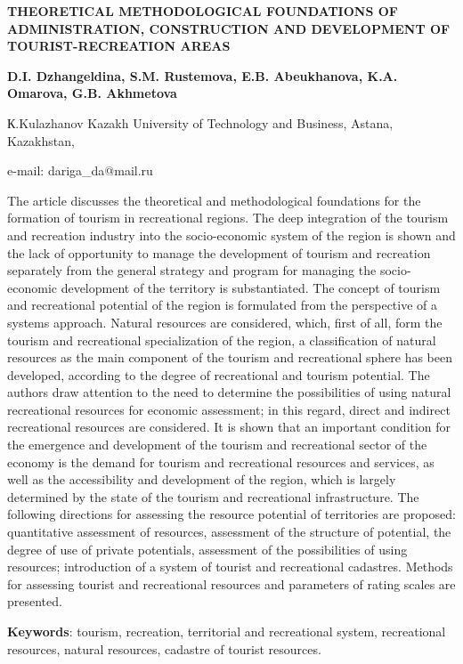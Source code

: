 \begin{center}
{\large\bfseries THEORETICAL METHODOLOGICAL FOUNDATIONS OF ADMINISTRATION,
CONSTRUCTION AND DEVELOPMENT OF TOURIST-RECREATION AREAS}

{\bfseries D.I. Dzhangeldina\envelope, S.M. Rustemova, E.B. Abeukhanova, K.A. Omarova, G.B. Akhmetova}

К.Kulazhanov Kazakh University of Technology and Business, Astana,
Kazakhstan,

e-mail: dariga\_da@mail.ru
\end{center}

The article discusses the theoretical and methodological foundations for
the formation of tourism in recreational regions. The deep integration
of the tourism and recreation industry into the socio-economic system of
the region is shown and the lack of opportunity to manage the
development of tourism and recreation separately from the general
strategy and program for managing the socio-economic development of the
territory is substantiated. The concept of tourism and recreational
potential of the region is formulated from the perspective of a systems
approach. Natural resources are considered, which, first of all, form
the tourism and recreational specialization of the region, a
classification of natural resources as the main component of the tourism
and recreational sphere has been developed, according to the degree of
recreational and tourism potential. The authors draw attention to the
need to determine the possibilities of using natural recreational
resources for economic assessment; in this regard, direct and indirect
recreational resources are considered. It is shown that an important
condition for the emergence and development of the tourism and
recreational sector of the economy is the demand for tourism and
recreational resources and services, as well as the accessibility and
development of the region, which is largely determined by the state of
the tourism and recreational infrastructure. The following directions
for assessing the resource potential of territories are proposed:
quantitative assessment of resources, assessment of the structure of
potential, the degree of use of private potentials, assessment of the
possibilities of using resources; introduction of a system of tourist
and recreational cadastres. Methods for assessing tourist and
recreational resources and parameters of rating scales are presented.

{\bfseries Keywords}: tourism, recreation, territorial and recreational
system, recreational resources, natural resources, cadastre of tourist
resources.

